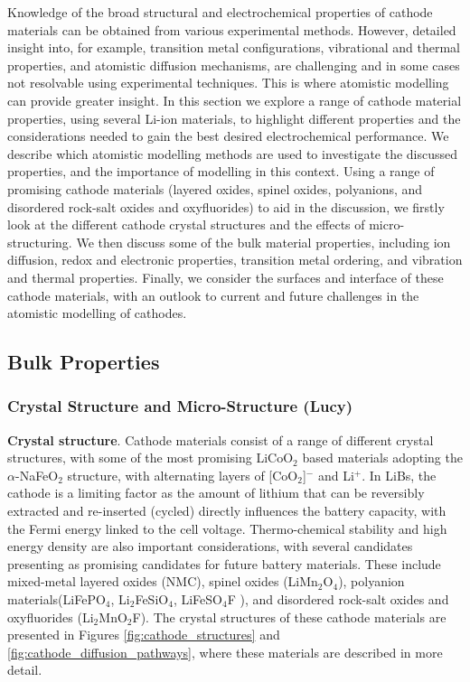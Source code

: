 \documentclass[../main.tex]{subfiles}
\begin{document}
Knowledge of the broad structural and electrochemical properties of cathode materials can be obtained from various experimental methods. However, detailed insight into, for example, transition metal configurations, vibrational and thermal properties, and atomistic diffusion mechanisms, are challenging and in some cases not resolvable using experimental techniques. This is where atomistic modelling can provide greater insight. In this section we explore a range of cathode material properties, using several Li-ion materials, to highlight different properties and the considerations needed to gain the best desired electrochemical performance. We describe which atomistic modelling methods are used to investigate the discussed properties, and the importance of modelling in this context. Using a range of promising cathode materials (layered oxides, spinel oxides, polyanions, and disordered rock-salt oxides and oxyfluorides) to aid in the discussion, we firstly look at the different cathode crystal structures and the effects of micro-structuring. We then discuss some of the bulk material properties, including ion diffusion, redox and electronic properties, transition metal ordering, and vibration and thermal properties. Finally, we consider the surfaces and interface of these cathode materials, with an outlook to current and future challenges in the atomistic modelling of cathodes.

\subsection{Bulk Properties}
\subsubsection{Crystal Structure and Micro-Structure (Lucy)}
\textbf{Crystal structure}. Cathode materials consist of a range of different crystal structures, with some of the most promising LiCoO$_2$ based materials adopting the $\alpha$-NaFeO$_2$ structure, with alternating layers of [CoO$_2$]$^-$ and Li$^+$. In LiBs, the cathode is a limiting factor as the amount of lithium that can be reversibly extracted and re-inserted (cycled) directly influences the battery capacity, with the Fermi energy linked to the cell voltage. \cite{islam2014lithium} Thermo-chemical stability and high energy density are also important considerations, with several candidates presenting as promising candidates for future battery materials. These include mixed-metal layered oxides (NMC), spinel oxides (LiMn$_2$O$_4$), polyanion materials(LiFePO$_4$, \cite{whittingham2008materials,masquelier2013polyanionic,goodenough_li-ion_2013, zaghib2013review} Li$_2$FeSiO$_4$, \cite{nyten2005electrochemical,sirisopanaporn2011polymorphism,islam2011silicate} LiFeSO$_4$F \cite{padhi1997mapping}), and disordered rock-salt oxides and oxyfluorides (Li$_2$MnO$_2$F\cite{Jacquet2019, clement2020, Chang2020, Tygesen2020, Sharpe2020}). The crystal structures of these cathode materials are presented in Figures \ref{fig:cathode_structures} and \ref{fig:cathode_diffusion_pathways}, where these materials are described in more detail.
\end{document}
